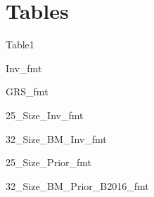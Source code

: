 
\section{Tables}

{Table1}

{Inv_fmt}

\begin{landscape}

\begin{table}%
  \label{tbl:chars}%
  \scriptsize
  \centering
  \caption{Average value-weighted characteristics -- 1963-07 through 2016-12}%
  \qquad
\end{table}

\end{landscape}

{GRS_fmt}

{25_Size_Inv_fmt}

\begin{landscape}
{32_Size_BM_Inv_fmt}
\end{landscape}
\restoregeometry

\begin{landscape}

\begin{table}%
  \label{tbl:vol}%
  \scriptsize
  \centering
  \caption{25-Size-Var Portfolios -- 1963-07 through 2016-12}%
  \qquad
\end{table}

\end{landscape}
\restoregeometry

{25_Size_Prior_fmt}

\begin{landscape}
{32_Size_BM_Prior_B2016_fmt}
\end{landscape}

